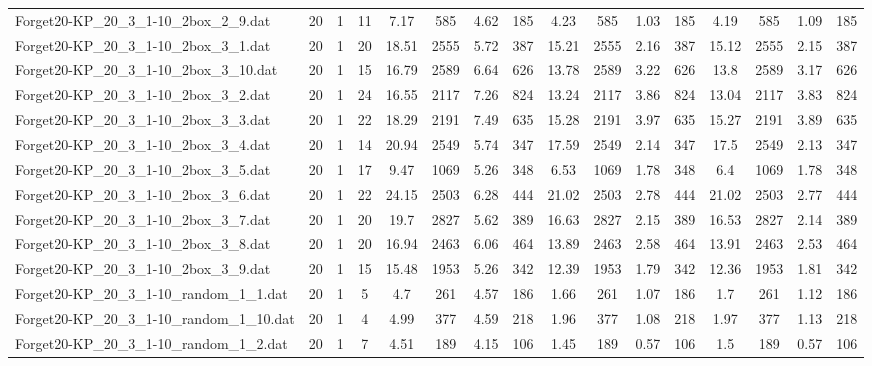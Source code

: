 \begin{sidewaystable}[!ht]
{\begin{tabular}{lccccccccccccccc}
Forget20-KP\_20\_3\_1-10\_2box\_2\_9.dat & 20 & 1 & 11 & 7.17 & 585 & 4.62 & 185 & 4.23 & 585 &  \textcolor{blue2}{1.03} & 185 & 4.19 & 585 & 1.09 & 185 \\
Forget20-KP\_20\_3\_1-10\_2box\_3\_1.dat & 20 & 1 & 20 & 18.51 & 2555 & 5.72 & 387 & 15.21 & 2555 & 2.16 & 387 & 15.12 & 2555 & 2.15 & 387 \\
Forget20-KP\_20\_3\_1-10\_2box\_3\_10.dat & 20 & 1 & 15 & 16.79 & 2589 & 6.64 & 626 & 13.78 & 2589 & 3.22 & 626 & 13.8 & 2589 & 3.17 & 626 \\
Forget20-KP\_20\_3\_1-10\_2box\_3\_2.dat & 20 & 1 & 24 & 16.55 & 2117 & 7.26 & 824 & 13.24 & 2117 & 3.86 & 824 & 13.04 & 2117 & 3.83 & 824 \\
Forget20-KP\_20\_3\_1-10\_2box\_3\_3.dat & 20 & 1 & 22 & 18.29 & 2191 & 7.49 & 635 & 15.28 & 2191 & 3.97 & 635 & 15.27 & 2191 & 3.89 & 635 \\
Forget20-KP\_20\_3\_1-10\_2box\_3\_4.dat & 20 & 1 & 14 & 20.94 & 2549 & 5.74 & 347 & 17.59 & 2549 & 2.14 & 347 & 17.5 & 2549 & 2.13 & 347 \\
Forget20-KP\_20\_3\_1-10\_2box\_3\_5.dat & 20 & 1 & 17 & 9.47 & 1069 & 5.26 & 348 & 6.53 & 1069 & 1.78 & 348 & 6.4 & 1069 & 1.78 & 348 \\
Forget20-KP\_20\_3\_1-10\_2box\_3\_6.dat & 20 & 1 & 22 & 24.15 & 2503 & 6.28 & 444 & 21.02 & 2503 & 2.78 & 444 & 21.02 & 2503 & 2.77 & 444 \\
Forget20-KP\_20\_3\_1-10\_2box\_3\_7.dat & 20 & 1 & 20 & 19.7 & 2827 & 5.62 & 389 & 16.63 & 2827 & 2.15 & 389 & 16.53 & 2827 & 2.14 & 389 \\
Forget20-KP\_20\_3\_1-10\_2box\_3\_8.dat & 20 & 1 & 20 & 16.94 & 2463 & 6.06 & 464 & 13.89 & 2463 & 2.58 & 464 & 13.91 & 2463 & 2.53 & 464 \\
Forget20-KP\_20\_3\_1-10\_2box\_3\_9.dat & 20 & 1 & 15 & 15.48 & 1953 & 5.26 & 342 & 12.39 & 1953 & 1.79 & 342 & 12.36 & 1953 & 1.81 & 342 \\
Forget20-KP\_20\_3\_1-10\_random\_1\_1.dat & 20 & 1 & 5 & 4.7 & 261 & 4.57 & 186 & 1.66 & 261 &  \textcolor{blue2}{1.07} & 186 & 1.7 & 261 & 1.12 & 186 \\
Forget20-KP\_20\_3\_1-10\_random\_1\_10.dat & 20 & 1 & 4 & 4.99 & 377 & 4.59 & 218 & 1.96 & 377 &  \textcolor{blue2}{1.08} & 218 & 1.97 & 377 & 1.13 & 218 \\
Forget20-KP\_20\_3\_1-10\_random\_1\_2.dat & 20 & 1 & 7 & 4.51 & 189 & 4.15 & 106 & 1.45 & 189 &  \textcolor{blue2}{0.57} & 106 & 1.5 & 189 &  \textcolor{blue2}{0.57} & 106 \\

\end{tabular}}
\end{sidewaystable}
